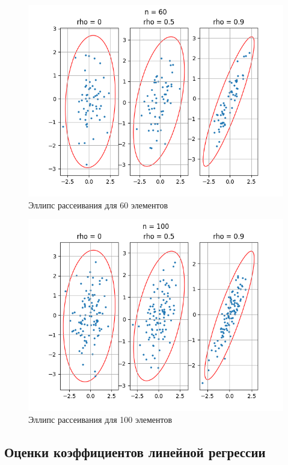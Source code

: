 \documentclass[../main.tex]{subfiles}
\begin{document}
    \begin{figure}[H]
        \centering
        \includegraphics[scale=0.85]{figures/elipse60.png}
        \caption{Эллипс рассеивания для 60 элементов}
    \end{figure}
    
    \begin{figure}[H]
        \centering
        \includegraphics[scale=0.85]{figures/elipse100.png}
        \caption{Эллипс рассеивания для 100 элементов}
    \end{figure}
    
    \subsection{Оценки коэффициентов линейной регрессии}
\end{document}
